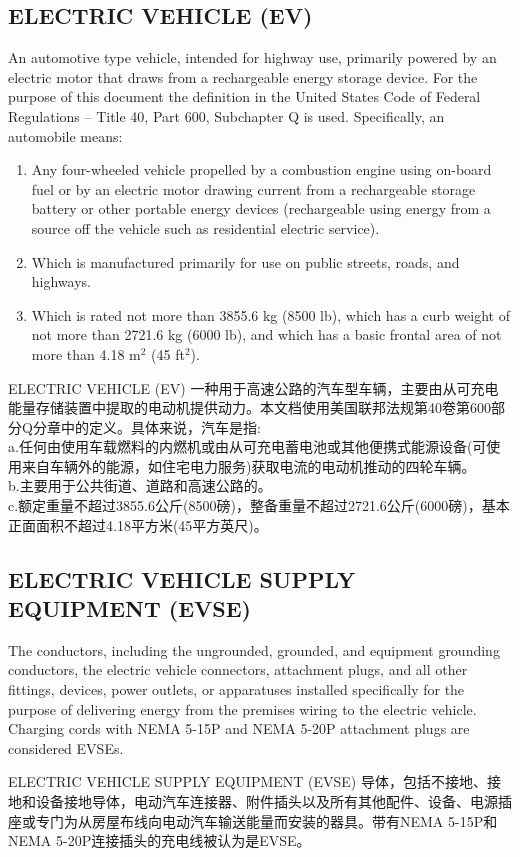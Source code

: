         \subsection*{ELECTRIC VEHICLE (EV)}
        \label{def11}
        An automotive type vehicle, intended for highway use, primarily powered by an electric motor that draws from a rechargeable energy storage device. For the purpose of this document the definition in the United States Code of Federal Regulations – Title 40, Part 600, Subchapter Q is used. Specifically, an automobile means:
        \begin{enumerate}[label=\alph*.]
            \item Any four-wheeled vehicle propelled by a combustion engine using on-board fuel or by an electric motor drawing current from a rechargeable storage battery or other portable energy devices (rechargeable using energy from a source off the vehicle such as residential electric service).
            \item Which is manufactured primarily for use on public streets, roads, and highways.
            \item Which is rated not more than 3855.6 kg (8500 lb), which has a curb weight of not more than 2721.6 kg (6000 lb), and which has a basic frontal area of not more than 4.18 m\(^2\) (45 ft\(^2\)).
        \end{enumerate}
        \begin{definition}{ELECTRIC VEHICLE (EV)}
        一种用于高速公路的汽车型车辆，主要由从可充电能量存储装置中提取的电动机提供动力。本文档使用美国联邦法规第40卷第600部分Q分章中的定义。具体来说，汽车是指:\\
        a.任何由使用车载燃料的内燃机或由从可充电蓄电池或其他便携式能源设备(可使用来自车辆外的能源，如住宅电力服务)获取电流的电动机推动的四轮车辆。\\
        b.主要用于公共街道、道路和高速公路的。\\
        c.额定重量不超过3855.6公斤(8500磅)，整备重量不超过2721.6公斤(6000磅)，基本正面面积不超过4.18平方米(45平方英尺)。\\
        \end{definition}
        
        \subsection*{ELECTRIC VEHICLE SUPPLY EQUIPMENT (EVSE)}
        \label{def12}
        The conductors, including the ungrounded, grounded, and equipment grounding conductors, the electric vehicle connectors, attachment plugs, and all other fittings, devices, power outlets, or apparatuses installed specifically for the purpose of delivering energy from the premises wiring to the electric vehicle. Charging cords with NEMA 5-15P and NEMA 5-20P attachment plugs are considered EVSEs.
        \begin{definition}{ELECTRIC VEHICLE SUPPLY EQUIPMENT (EVSE)}
        导体，包括不接地、接地和设备接地导体，电动汽车连接器、附件插头以及所有其他配件、设备、电源插座或专门为从房屋布线向电动汽车输送能量而安装的器具。带有NEMA 5-15P和NEMA 5-20P连接插头的充电线被认为是EVSE。
        \end{definition}
        

